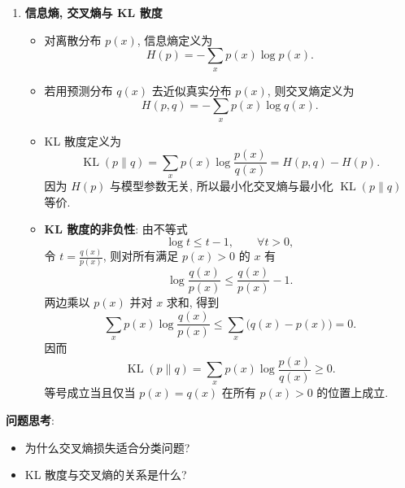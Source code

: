 \documentclass{../nndlcourse}
\begin{document}
\begin{enumerate}
\begin{itemize}
    \end{itemize}
    \item \textbf{信息熵, 交叉熵与 KL 散度}
    \begin{itemize}
        \item 对离散分布 $p(x)$, 信息熵定义为
        \begin{equation*}
            H(p) = -\sum_x p(x) \log p(x).
        \end{equation*}
        \item 若用预测分布 $q(x)$ 去近似真实分布 $p(x)$, 则交叉熵定义为
        \begin{equation*}
            H(p, q) = -\sum_x p(x) \log q(x).
        \end{equation*}
        \item KL 散度定义为
        \begin{equation*}
            \operatorname{KL}(p \| q) = \sum_x p(x) \log \frac{p(x)}{q(x)} = H(p, q) - H(p).
        \end{equation*}
        因为 $H(p)$ 与模型参数无关, 所以最小化交叉熵与最小化 $\operatorname{KL}(p \| q)$ 等价.
        \item \textbf{KL 散度的非负性}: 由不等式
        \begin{equation*}
            \log t \le t - 1, \qquad \forall t > 0,
        \end{equation*}
        令 $t = \frac{q(x)}{p(x)}$, 则对所有满足 $p(x) > 0$ 的 $x$ 有
        \begin{equation*}
            \log \frac{q(x)}{p(x)} \le \frac{q(x)}{p(x)} - 1.
        \end{equation*}
        两边乘以 $p(x)$ 并对 $x$ 求和, 得到
        \begin{equation*}
            \sum_x p(x) \log \frac{q(x)}{p(x)}
            \le
            \sum_x \bigl(q(x) - p(x)\bigr)
            = 0.
        \end{equation*}
        因而
        \begin{equation*}
            \operatorname{KL}(p \| q)
            = \sum_x p(x) \log \frac{p(x)}{q(x)}
            \ge 0.
        \end{equation*}
        等号成立当且仅当 $p(x) = q(x)$ 在所有 $p(x) > 0$ 的位置上成立.
    \end{itemize}
\end{enumerate}

\textbf{问题思考}:
\begin{itemize}
    \item 为什么交叉熵损失适合分类问题?
    \item KL 散度与交叉熵的关系是什么?
\end{itemize}
\end{document}
